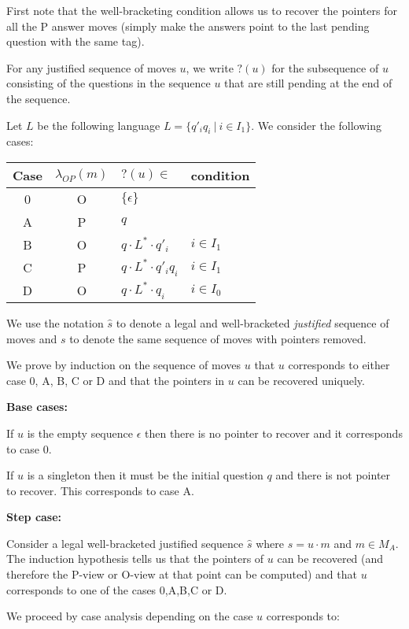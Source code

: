 
First note that the well-bracketing condition allows us to recover
the pointers for all the P answer moves (simply make the answers point
to the last pending question with the same tag).

For any justified sequence of moves $u$, we write $?(u)$ for the subsequence of $u$ consisting of the questions in the sequence $u$ that are still pending at the end of the sequence.

Let $L$ be the following language $L = \{ q'_i q_i\ | \ i \in I_1 \}$.
We consider the following cases:

\begin{center}
\begin{tabular}{c|c|l|l}
Case & $\lambda_{OP}(m)$ & $?(u) \in$ & condition \\ \hline
0 & O & $\{ \epsilon \}$ \\
A & P & $q$ \\
B & O & $q \cdot L^* \cdot q'_i$     & $i \in I_1$ \\
C & P & $q \cdot L^* \cdot q'_i q_i$ & $i \in I_1$ \\
D & O & $q \cdot L^* \cdot q_i$      & $i \in I_0$ \\
\end{tabular}
\end{center}

We use the notation $\hat{s}$ to denote a legal and well-bracketed \emph{justified} sequence of moves and
$s$ to denote the same sequence of moves with pointers removed.

We prove by induction on the sequence of moves $u$ that $u$ corresponds to either
case 0, A, B, C or D and that the pointers in $u$ can be recovered uniquely.

\textbf{Base cases:}

If $u$ is the empty sequence $\epsilon$ then there is no pointer to recover and it corresponds to case 0.

If $u$ is a singleton then it must be the initial question $q$ and there is not pointer to recover. This corresponds
to case A.

\textbf{Step case:}

Consider a legal well-bracketed justified sequence $\hat{s}$ where $s = u \cdot m$ and $m \in M_A$.
The induction hypothesis tells us
that the pointers of $u$ can be recovered (and therefore the P-view or O-view at that point can be
computed) and that $u$ corresponds to one of the cases 0,A,B,C or D.

We proceed by case analysis depending on the case $u$ corresponds to:

